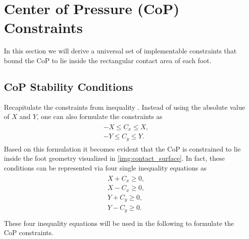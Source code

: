 \section{Center of Pressure (CoP) Constraints}\label{sec:StabilityCoP}
In this section we will derive a universal set of implementable constraints that bound the \gls{CoP} to lie inside the rectangular contact area of each foot.

\subsection{CoP Stability Conditions}
Recapitulate the constraints from inequality . Instead of using the absolute value of $X$ and $Y$, one can also formulate the constraints as
\begin{align}
\begin{split}
-X \leq C_x \leq X,\\
-Y \leq C_y \leq Y.
\end{split}
\end{align}
Based on this formulation it becomes evident that the \gls{CoP} is constrained to lie inside the foot geometry visualized in \cref{img:contact_surface}. In fact, these conditions can be represented via four single inequality equations as
\begin{align}\label{eqn:CoPInequalities}
\begin{split}
X + C_x \geq 0, \\
X - C_x \geq 0, \\
Y + C_y \geq 0, \\
Y - C_y \geq 0. \\
\end{split}
\end{align}
These four inequality equations will be used in the following to formulate the \gls{CoP} constraints.   

